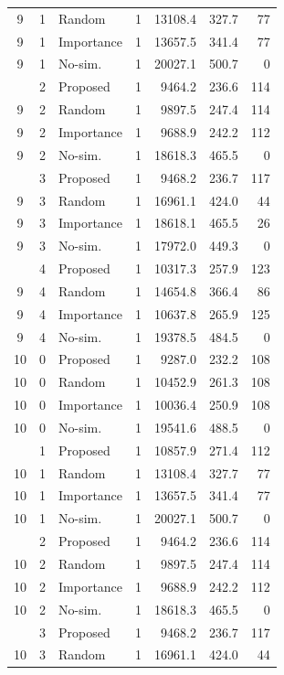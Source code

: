 \begin{table}[t]
\begin{tabular}{cc l c r r r}
9 & 1 & Random & 1 & 13108.4 & 327.7 & 77 \\
9 & 1 & Importance & 1 & 13657.5 & 341.4 & 77 \\
9 & 1 & No-sim. & 1 & 20027.1 & 500.7 & 0 \\
\addlinespace[1pt]
9 & 2 & Proposed & 1 & 9464.2 & 236.6 & 114 \\
9 & 2 & Random & 1 & 9897.5 & 247.4 & 114 \\
9 & 2 & Importance & 1 & 9688.9 & 242.2 & 112 \\
9 & 2 & No-sim. & 1 & 18618.3 & 465.5 & 0 \\
\addlinespace[1pt]
9 & 3 & Proposed & 1 & 9468.2 & 236.7 & 117 \\
9 & 3 & Random & 1 & 16961.1 & 424.0 & 44 \\
9 & 3 & Importance & 1 & 18618.1 & 465.5 & 26 \\
9 & 3 & No-sim. & 1 & 17972.0 & 449.3 & 0 \\
\addlinespace[1pt]
9 & 4 & Proposed & 1 & 10317.3 & 257.9 & 123 \\
9 & 4 & Random & 1 & 14654.8 & 366.4 & 86 \\
9 & 4 & Importance & 1 & 10637.8 & 265.9 & 125 \\
9 & 4 & No-sim. & 1 & 19378.5 & 484.5 & 0 \\
\midrule
10 & 0 & Proposed & 1 & 9287.0 & 232.2 & 108 \\
10 & 0 & Random & 1 & 10452.9 & 261.3 & 108 \\
10 & 0 & Importance & 1 & 10036.4 & 250.9 & 108 \\
10 & 0 & No-sim. & 1 & 19541.6 & 488.5 & 0 \\
\addlinespace[1pt]
10 & 1 & Proposed & 1 & 10857.9 & 271.4 & 112 \\
10 & 1 & Random & 1 & 13108.4 & 327.7 & 77 \\
10 & 1 & Importance & 1 & 13657.5 & 341.4 & 77 \\
10 & 1 & No-sim. & 1 & 20027.1 & 500.7 & 0 \\
\addlinespace[1pt]
10 & 2 & Proposed & 1 & 9464.2 & 236.6 & 114 \\
10 & 2 & Random & 1 & 9897.5 & 247.4 & 114 \\
10 & 2 & Importance & 1 & 9688.9 & 242.2 & 112 \\
10 & 2 & No-sim. & 1 & 18618.3 & 465.5 & 0 \\
\addlinespace[1pt]
10 & 3 & Proposed & 1 & 9468.2 & 236.7 & 117 \\
10 & 3 & Random & 1 & 16961.1 & 424.0 & 44 \\

\end{tabular}
\end{table}
